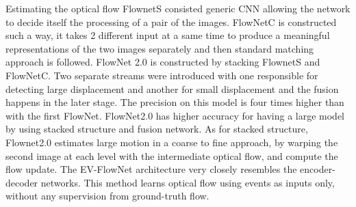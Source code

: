 \documentclass[11pt,english]{article}
\begin{document}
Estimating the optical flow FlownetS \citep{dosovitskiy2015flownet} consisted generic CNN allowing the network to decide itself the processing of a pair of the images. FlowNetC\citep{dosovitskiy2015flownet}  is constructed such a way, it takes 2 different input at a same time to produce a meaningful representations of the two images separately and then standard matching approach is followed. FlowNet 2.0 \citep{ilg2017flownet} is constructed by stacking FlownetS and FlowNetC. Two separate streams were introduced with one responsible for detecting large displacement and another for small displacement and the fusion happens in the later stage. The precision on this model is four times higher than with the first FlowNet.
 FlowNet2.0 has higher accuracy for having a large model by using stacked structure and fusion network. As for stacked structure, Flownet2.0 estimates large motion in a coarse to fine approach, by warping the second image at each level with the intermediate optical flow, and compute the flow update. The EV-FlowNet\citep{zhu2018ev} architecture very closely resembles the encoder-decoder networks. This method learns optical flow using events as inputs only, without any supervision from ground-truth flow.
\end{document}
